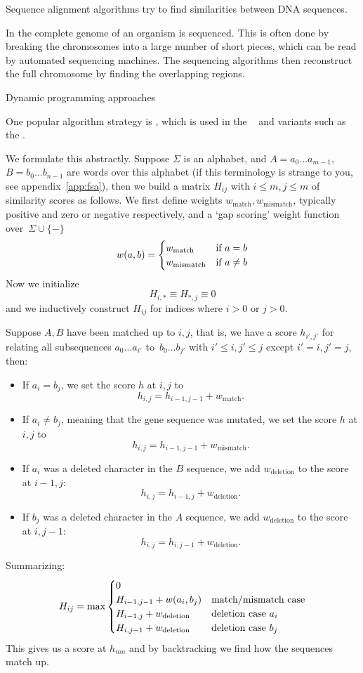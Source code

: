Sequence alignment algorithms try to find similarities between 
DNA sequences.

In  the complete genome of an 
organism is sequenced. This is often done by breaking the chromosomes
into a large number of short pieces, which can be read by automated
sequencing machines. The sequencing algorithms then reconstruct
the full chromosome by finding the overlapping regions.

 {Dynamic programming approaches}

One popular  algorithm strategy is
, which is used in the
~\cite{NeedlemanWunsch}
and variants such as the
.

We formulate this abstractly. Suppose $\Sigma$ is an alphabet, 
and $A=a_0\ldots a_{m-1}$, $B=b_0\ldots b_{n-1}$ are words over this alphabet
(if this terminology is strange to you, see appendix~\ref{app:fsa}),
then we build a matrix $H_{ij}$ with $i\leq m, j\leq m$
of similarity scores as follows.
%
\newcommand\wm{w_{\mathrm{match}}}
\newcommand\ws{w_{\mathrm{mismatch}}}
\newcommand\wdel{w_{\mathrm{deletion}}}
We first define weights $\wm,\ws$, typically positive and zero or negative 
respectively, and a `gap scoring' weight function over~$\Sigma\cup\{-\}$
\[ w(a,b)=
\begin{cases}
  \wm&\hbox{if $a=b$}\\ \ws&\hbox{if $a\not=b$}
\end{cases}
\]
Now we initialize
\[ H_{i,*}\equiv H_{*,j}\equiv 0 \]
and we inductively construct $H_{ij}$ for indices where $i>0$ or $j>0$.

Suppose $A,B$ have been matched up to $i,j$, that is, 
we have a score $h_{i',j'}$
for relating all subsequences
$a_0\ldots a_{i'}$ to~$b_0\ldots b_{j'}$ with $i'\leq i,j'\leq j$
except $i'=i,j'=j$, then:
\begin{itemize}
\item If $a_i=b_j$, we set the score $h$ at $i,j$ to
  \[ h_{i,j} = h_{i-1,j-1}+\wm. \]
\item If $a_i\not=b_j$, meaning that the gene sequence was mutated,
  we set the score $h$ at $i,j$ to
  \[ h_{i,j} = h_{i-1,j-1}+\ws. \]
\item If $a_i$ was a deleted character in the $B$ sequence,
  we add $\wdel$ to the score at $i-1,j$:
  \[ h_{i,j} = h_{i-1,j}+\wdel. \]
\item If $b_j$ was a deleted character in the $A$ sequence,
  we add $\wdel$ to the score at $i,j-1$:
  \[ h_{i,j} = h_{i,j-1}+\wdel. \]
\end{itemize}
Summarizing:
\[ H_{ij} = \max
\begin{cases}
  0\\
  H_{i-1,j-1}+w(a_i,b_j)&\hbox{match/mismatch case}\\
  H_{i-1,j}+\wdel       &\hbox{deletion case $a_i$}\\
  H_{i,j-1}+\wdel       &\hbox{deletion case $b_j$}\\
\end{cases}
\]
This gives us a score at $h_{mn}$ and by backtracking we find
how the sequences match up.

